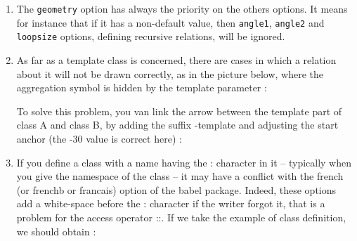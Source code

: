 \documentclass[a4paper,11pt]{report}
\newcommand{\inputTikZ}[1]{%
  }%
\newcommand{\inputTikZ}[1]{%
    \texttt{[image: fig/\#1.pdf]}%
  }%
\begin{document}
\begin{enumerate}
\item The {\tt geometry} option has always the priority on the others options. It means for instance that if it has a non-default value, then {\tt angle1}, {\tt angle2} and {\tt loopsize} options, defining recursive relations, will be ignored.
\item As far as a template class is concerned, there are cases in which a relation about it will not be drawn correctly, as in the picture below, where the aggregation symbol is hidden by the template parameter :

\begin{minipage}{0.6\textwidth}

\end{minipage}
\begin{minipage}{0.4\textwidth}
\begin{center}
\inputTikZ{bugtemplate}
\end{center}
\end{minipage}

\medskip

To solve this problem,  you van link the arrow between the template part of class A and class B, by adding the suffix -template and adjusting the start anchor (the -30 value is correct here) :

\medskip

\begin{minipage}{0.6\textwidth}

\end{minipage}
\begin{minipage}{0.4\textwidth}
\begin{center}
\inputTikZ{bugtemplate2}
\end{center}
\end{minipage}

\medskip

\item If you define a class with a name having the : character in it -- typically when you give the namespace of the class -- it may have a conflict with the french (or frenchb or francais) option of the babel package. Indeed, these options add a white-space before the : character if the writer forgot it, that is a problem for the access operator ::. If we take the example of class definition, we should obtain :

\medskip

\begin{minipage}{0.6\textwidth}

\end{minipage}
\begin{minipage}{0.4\textwidth}
\begin{center}
\end{center}
\end{minipage}


\end{enumerate}
\end{document}
